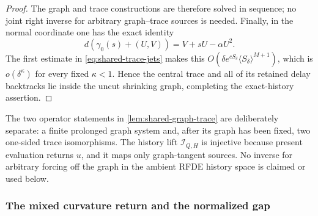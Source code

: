 \begin{proof}
The graph and trace constructions are therefore solved in sequence; no
joint right inverse for arbitrary graph--trace sources is needed.  Finally,
in the normal coordinate one has the exact identity
\[
 d(\gamma_0(s)+(U,V))=V+sU-\alpha U^2.
\]
The first estimate in \cref{eq:shared-trace-jets} makes this
\(O(\delta e^{cS_\delta}\langle S_\delta\rangle^{M+1})\), which is
\(o(\delta^\kappa)\) for every fixed \(\kappa<1\).  Hence the central trace
and all of its retained delay backtracks lie inside the uncut shrinking
graph, completing the exact-history assertion.
\end{proof}

The two operator statements in \cref{lem:shared-graph-trace} are deliberately
separate: a finite prolonged graph system and, after its graph has been
fixed, two one-sided trace isomorphisms.  The history lift
\(\mathcal I_{Q,H}\) is injective because present evaluation returns \(u\),
and it maps only graph-tangent sources.  No inverse for arbitrary forcing off
the graph in the ambient RFDE history space is claimed or used below.

\subsubsection{The mixed curvature return and the normalized gap}

